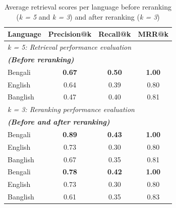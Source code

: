 \documentclass[sigconf]{acmart}
\begin{document}
\begin{table}[H]
    \caption{Average retrieval scores per language before reranking (\textit{k = 5} and \textit{k = 3}) and after reranking (\textit{k = 3})}
    \label{tab4}
    \begin{tabular}{lccc}
        \toprule
        \textbf{Language} & \textbf{Precision@k} & \textbf{Recall@k} & \textbf{MRR@k}\\
        \toprule
        \multicolumn{4}{l}{\textit{k = 5: Retrieval performance evaluation}}\\
        \multicolumn{4}{l}{\textit{\textbf{(Before reranking)}}}\\
        \midrule
        Bengali & \textbf{0.67} & \textbf{0.50} & \textbf{1.00}\\
        English & 0.64 & 0.39 & 0.80\\
        Banglish & 0.47 & 0.40 & 0.81\\
        \midrule
        \multicolumn{4}{l}{\textit{k = 3: Reranking performance evaluation}}\\
        \multicolumn{4}{l}{\textit{\textbf{(Before and after reranking)}}}\\
        \midrule
        Bengali & \textbf{0.89} & \textbf{0.43} & \textbf{1.00}\\
        English & 0.73 & 0.30 & 0.80\\
        Banglish & 0.67 & 0.35 & 0.81\\
        \midrule
        Bengali & \textbf{0.78} & \textbf{0.42} & \textbf{1.00}\\
        English & 0.73 & 0.30 & 0.80\\
        Banglish & 0.61 & 0.35 & 0.83\\
        \bottomrule
    \end{tabular}
\end{table}
\end{document}
